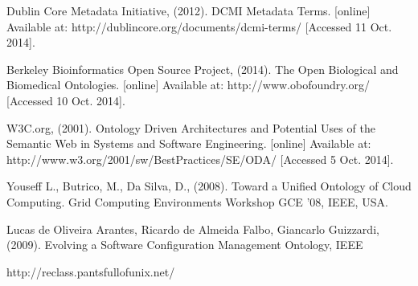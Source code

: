 \newblock Dublin Core Metadata Initiative, (2012). DCMI Metadata Terms. [online] Available at: http://dublincore.org/documents/dcmi-terms/ [Accessed 11 Oct. 2014].

\newblock Berkeley Bioinformatics Open Source Project, (2014). The Open Biological and Biomedical Ontologies. [online] Available at: http://www.obofoundry.org/ [Accessed 10 Oct. 2014].

\newblock W3C.org, (2001). Ontology Driven Architectures and Potential Uses of the Semantic Web in Systems and Software Engineering. [online] Available at:
 http://www.w3.org/2001/sw/BestPractices/SE/ODA/ [Accessed 5 Oct. 2014].

\newblock Youseff L., Butrico, M., Da Silva, D., (2008). Toward a Unified Ontology of Cloud Computing. Grid Computing Environments Workshop GCE '08, IEEE, USA.

\newblock Lucas de Oliveira Arantes, Ricardo de Almeida Falbo, Giancarlo Guizzardi, (2009). Evolving a Software Configuration Management Ontology, IEEE

\newblock http://reclass.pantsfullofunix.net/











